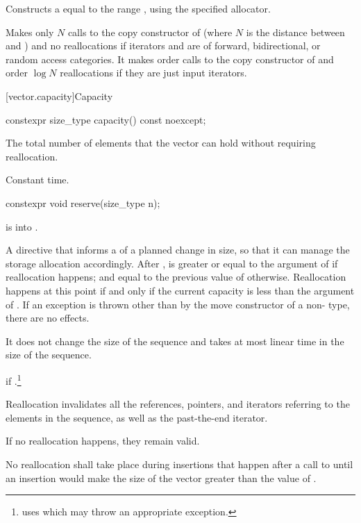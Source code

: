 \begin{itemdescr}

\pnum
\effects
Constructs a  equal to the
range , using the specified allocator.

\pnum
\complexity
Makes only $N$
calls to the copy constructor of
(where $N$
is the distance between
and
)
and no reallocations if iterators  and  are of forward, bidirectional, or random access categories.
It makes order
calls to the copy constructor of
and order
$\log N$
reallocations if they are just input iterators.
\end{itemdescr}

[vector.capacity]{Capacity}

%
\begin{itemdecl}
constexpr size_type capacity() const noexcept;
\end{itemdecl}

\begin{itemdescr}
\pnum
\returns
The total number of elements that the vector can hold
without requiring reallocation.

\pnum
\complexity
Constant time.
\end{itemdescr}

%
\begin{itemdecl}
constexpr void reserve(size_type n);
\end{itemdecl}

\begin{itemdescr}
\pnum
\expects
{} is  into .

\pnum
\effects
A directive that informs a
of a planned change in size, so that it can manage the storage allocation accordingly.
After
,
is greater or equal to the argument of
if reallocation happens; and equal to the previous value of
otherwise.
Reallocation happens at this point if and only if the current capacity is less than the
argument of
. If an exception is thrown
other than by the move constructor of a non- type,
there are no effects.

\pnum
\complexity
It does not change the size of the sequence and takes at most linear
time in the size of the sequence.

\pnum
\throws
{} if .\footnote{ uses  which
may throw an appropriate exception.}

\pnum
\remarks
Reallocation invalidates all the references, pointers, and iterators
referring to the elements in the sequence, as well as the past-the-end iterator.
\begin{note}
If no reallocation happens, they remain valid.
\end{note}
No reallocation shall take place during insertions that happen
after a call to 
until an insertion would make the size of the vector
greater than the value of .
\end{itemdescr}

